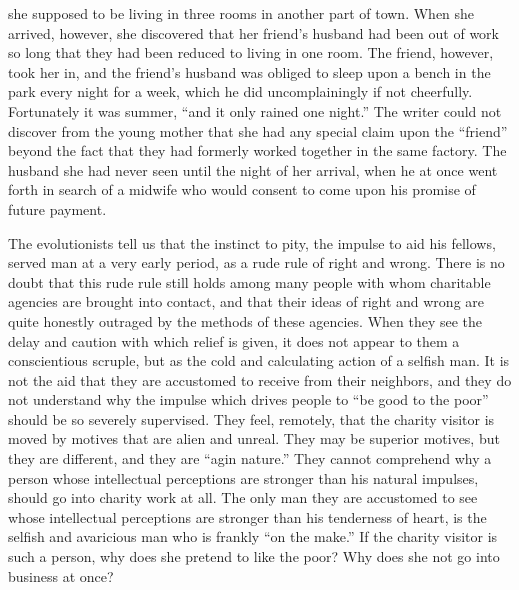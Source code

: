 \documentclass[]{article}
\begin{document}
\begin{sectionbody}
she supposed to be living in three rooms in another part of town. When
she arrived, however, she discovered that her friend's husband had been
out of work so long that they had been reduced to living in one room.
The friend, however, took her in, and the friend's husband was obliged
to sleep upon a bench in the park every night for a week, which he did
uncomplainingly if not cheerfully. Fortunately it was summer, ``and it
only rained one night.'' The writer could not discover from the young
mother that she had any special claim upon the ``friend'' beyond the fact
that they had formerly worked together in the same factory. The husband
she had never seen until the night of her arrival, when he at once went
forth in search of a midwife who would consent to come upon his promise
of future payment.

\addamsparagraph The evolutionists tell us that the instinct to pity, the impulse to aid
his fellows, served man at a very early period, as a rude rule of right
and wrong. There is no doubt that this rude rule still holds among many
people with whom charitable agencies are brought into contact, and that
their ideas of right and wrong are quite honestly outraged by the
methods of these agencies. When they see the delay and caution with
which relief is given, it does not appear to them a conscientious
scruple, but as the cold and calculating action of a selfish man. It is
not the aid that they are accustomed to receive from their neighbors,
and they do not understand why the impulse which drives people to ``be
good to the poor'' should be so severely supervised. They feel,
remotely, that the charity visitor is moved by motives that are alien
and unreal. They may be superior motives, but they are different, and
they are ``agin nature.'' They cannot comprehend why a person whose
intellectual perceptions are stronger than his natural impulses, should
go into charity work at all. The only man they are accustomed to see
whose intellectual perceptions are stronger than his tenderness of
heart, is the selfish and avaricious man who is frankly ``on the make.''
If the charity visitor is such a person, why does she pretend to like
the poor? Why does she not go into business at once?


\end{sectionbody}
\end{document}
